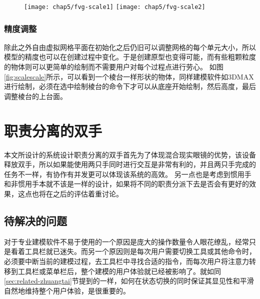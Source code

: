 
\begin{figure}[!htp]
  \centering
  \texttt{[image: chap5/fvg-scale1]}
  \hspace{1em}
  \texttt{[image: chap5/fvg-scale2]}
\end{figure}

\subsubsection{精度调整}
除此之外自由虚拟网格平面在初始化之后仍旧可以调整网格的每个单元大小，所以模型的精度也可以在创建过程中变化。于是创建原型也变得可能，而有些粗颗粒度的物体则可以更简单的绘制而不需要用户对每个过程点进行劳心。
如图\ref{fig:scalescale}所示，可以看到一个棱台一样形状的物体，同样建模软件如3DMAX进行绘制，必须在选中绘制棱台的命令下才可以从底座开始绘制，然后高度，最后调整棱台的上台面。


\section{职责分离的双手}

本文所设计的系统设计职责分离的双手首先为了体现混合现实眼镜的优势，该设备释放双手，所以如果能使用两只手同时进行交互是非常有利的，并且两只手完成的任务不一样，有协作有并发更可以体现该系统的高效。
另一点也是考虑到惯用手和非惯用手本就不该是一样的设计，如果将不同的职责分派下去是否会有更好的效果，这点也将在之后的评估着重讨论。

\subsection{待解决的问题}

对于专业建模软件不易于使用的一个原因是庞大的操作数量令人眼花缭乱，经常只是看着工具栏就已迷失。而另一个原因则是每次用户需要切换工具或其他命令时，必须要中断当前的建模过程，去工具栏中寻找合适的指令，而每次用户将注意力转移到工具栏或菜单栏后，整个建模的用户体验就已经被影响了。就如同\ref{sec:related-zhuangtai}节提到的一样，如何在状态切换的同时保证其显见性和平滑自然地维持整个用户体验，是很重要的。

